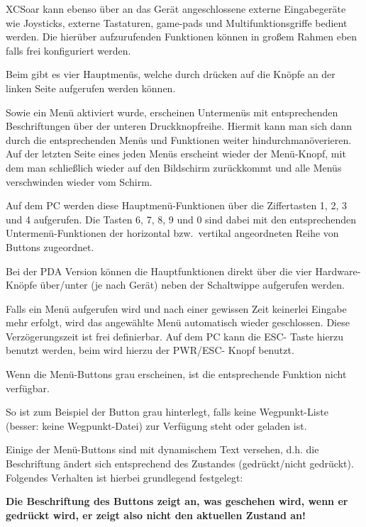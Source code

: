  \textsf{XCSoar} kann ebenso über an das Gerät angeschlossene externe Eingabegeräte wie Joysticks, externe Tastaturen, game-pads und Multifunktionsgriffe bedient werden. Die hierüber aufzurufenden Funktionen können in großem Rahmen eben falls frei konfiguriert  werden.


Beim  \al  gibt es vier Hauptmenüs, welche durch drücken auf die Knöpfe an der linken Seite aufgerufen werden können. 

Sowie ein Menü aktiviert wurde, erscheinen Untermenüs mit entsprechenden Beschriftungen über der unteren Druckknopfreihe. 
Hiermit kann man sich dann durch die entsprechenden Menüs und Funktionen weiter hindurchmanöverieren. 
Auf der letzten Seite eines jeden Menüs erscheint wieder der Menü-Knopf, mit dem man schließlich wieder auf den 
Bildschirm zurückkommt und alle Menüs verschwinden wieder vom Schirm. 
 


Auf dem \textsf{PC} werden diese Hauptmenü-Funktionen über die Ziffertasten 1, 2, 3 und  4 aufgerufen. Die Tasten 6, 7, 8, 9 und  0 sind dabei mit den
entsprechenden Untermenü-Funktionen der horizontal bzw.\ vertikal angeordneten Reihe von Buttons  zugeordnet.

Bei der PDA Version können die Hauptfunktionen direkt über die vier Hardware-Knöpfe über/unter (je nach Gerät) neben der Schaltwippe aufgerufen werden.

Falls ein Menü aufgerufen wird und nach einer gewissen Zeit keinerlei Eingabe mehr erfolgt, wird das angewählte Menü automatisch wieder geschlossen.  Diese Verzögerungszeit ist frei definierbar.  Auf dem \textsf{PC} kann die ESC- Taste hierzu benutzt werden, beim  \al wird hierzu der PWR/ESC- Knopf benutzt.

Wenn die Menü-Buttons grau erscheinen, ist die entsprechende Funktion nicht verfügbar.

So ist zum Beispiel der Button \textcolor{white}{} grau hinterlegt, falls keine Wegpunkt-Liste (besser: keine Wegpunkt-Datei) zur Verfügung steht oder geladen ist.

Einige der Menü-Buttons sind mit dynamischem Text versehen, d.h. die Beschriftung ändert sich entsprechend des Zustandes (gedrückt/nicht gedrückt). Folgendes Verhalten ist hierbei grundlegend festgelegt:


\textbf{Die Beschriftung des Buttons zeigt an, \textcolor[rgb]{0.72,0.03,0.20}{ was geschehen wird}, wenn er \warning gedrückt wird, er zeigt also nicht den aktuellen Zustand an!}

